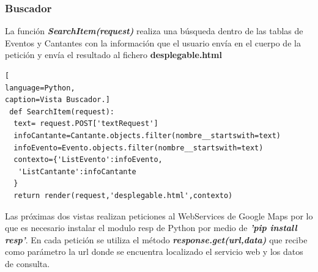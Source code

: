 \subsubsection*{Buscador} 
La función \textit{\textbf{SearchItem(request)}} realiza una búsqueda dentro de las tablas de Eventos y Cantantes con la información que el usuario envía en el cuerpo de la petición y envía el resultado al fichero \textbf{desplegable.html}
\begin{lstlisting}[
language=Python,
caption=Vista Buscador.]
 def SearchItem(request):
  text= request.POST['textRequest']
  infoCantante=Cantante.objects.filter(nombre__startswith=text)
  infoEvento=Evento.objects.filter(nombre__startswith=text)
  contexto={'ListEvento':infoEvento,
   'ListCantante':infoCantante
  }
  return render(request,'desplegable.html',contexto)
\end{lstlisting}
Las próximas dos vistas realizan peticiones al WebServices de Google Maps por lo que es
necesario instalar el modulo resp de Python por medio de \textit{\textbf{'pip install resp'}}. En cada petición se utiliza el método \textit{\textbf{response.get(url,data)}} que recibe como parámetro la url donde se encuentra localizado el servicio web y los datos de consulta.
